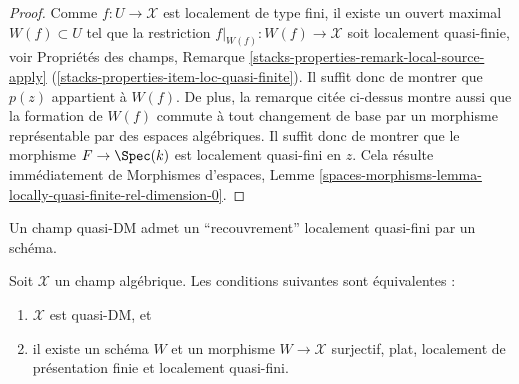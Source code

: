 \begin{proof}
Comme $f : U \to \mathcal{X}$ est localement de type fini, il existe un ouvert
maximal $W(f) \subset U$ tel que la restriction
$f|_{W(f)} : W(f) \to \mathcal{X}$ soit localement quasi-finie, voir
Propriétés des champs, Remarque
\ref{stacks-properties-remark-local-source-apply}
(\ref{stacks-properties-item-loc-quasi-finite}).
Il suffit donc de montrer que $p(z)$ appartient à $W(f)$.
De plus, la remarque citée ci-dessus montre aussi que la formation de $W(f)$
commute à tout changement de base par un morphisme représentable par des
espaces algébriques. Il suffit donc de montrer que le morphisme
$F \to \Spec(k)$ est localement quasi-fini en $z$. Cela résulte immédiatement
de Morphismes d'espaces,
Lemme \ref{spaces-morphisms-lemma-locally-quasi-finite-rel-dimension-0}.
\end{proof}

\noindent
Un champ quasi-DM admet un ``recouvrement'' localement quasi-fini par un schéma.

\begin{theorem}
\label{theorem-quasi-DM}
Soit $\mathcal{X}$ un champ algébrique. Les conditions suivantes sont
équivalentes :
\begin{enumerate}
\item $\mathcal{X}$ est quasi-DM, et
\item il existe un schéma $W$ et un morphisme $W \to \mathcal{X}$ surjectif,
plat, localement de présentation finie et localement quasi-fini.
\end{enumerate}
\end{theorem}

